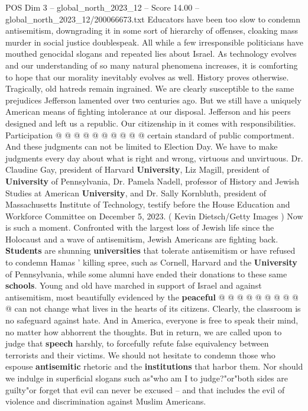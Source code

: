 \begin{textsample}{POS Dim 3 – global\_north\_2023\_12 – Score 14.00 – global\_north\_2023\_12/200066673.txt}
Educators have been too slow to condemn antisemitism, downgrading it in some sort of hierarchy of offenses, cloaking mass murder in social justice doublespeak.
All while a few irresponsible politicians have mouthed genocidal slogans and repeated lies about Israel.
As technology evolves and our understanding of so many natural phenomena increases, it is comforting to hope that our morality inevitably evolves as well.
History proves otherwise.
Tragically, old hatreds remain ingrained.
We are clearly susceptible to the same prejudices Jefferson lamented over two centuries ago.
But we still have a uniquely American means of fighting intolerance at our disposal.
Jefferson and his peers designed and left us a republic.
Our citizenship in it comes with responsibilities.
Participation @ @ @ @ @ @ @ @ @ @ certain standard of public comportment.
And these judgments can not be limited to Election Day.
We have to make judgments every day about what is right and wrong, virtuous and unvirtuous.
Dr.
Claudine Gay, president of Harvard \textbf{University}, Liz Magill, president of \textbf{University} of Pennsylvania, Dr.
Pamela Nadell, professor of History and Jewish Studies at American \textbf{University}, and Dr.
Sally Kornbluth, president of Massachusetts Institute of Technology, testify before the House Education and Workforce Committee on December 5, 2023. ( Kevin Dietsch/Getty Images ) Now is such a moment.
Confronted with the largest loss of Jewish life since the Holocaust and a wave of antisemitism, Jewish Americans are fighting back. \textbf{Students} are shunning \textbf{universities} that tolerate antisemitism or have refused to condemn Hamas ' killing spree, such as Cornell, Harvard and the \textbf{University} of Pennsylvania, while some alumni have ended their donations to these same \textbf{schools}.
Young and old have marched in support of Israel and against antisemitism, most beautifully evidenced by the \textbf{peaceful} @ @ @ @ @ @ @ @ @ @ can not change what lives in the hearts of its citizens.
Clearly, the classroom is no safeguard against hate.
And in America, everyone is free to speak their mind, no matter how abhorrent the thoughts.
But in return, we are called upon to judge that \textbf{speech} harshly, to forcefully refute false equivalency between terrorists and their victims.
We should not hesitate to condemn those who espouse \textbf{antisemitic} rhetoric and the \textbf{institutions} that harbor them.
Nor should we indulge in superficial slogans such as"who am I to judge?"or"both sides are guilty"or forget that evil can never be excused -- and that includes the evil of violence and discrimination against Muslim Americans.

\end{textsample}
